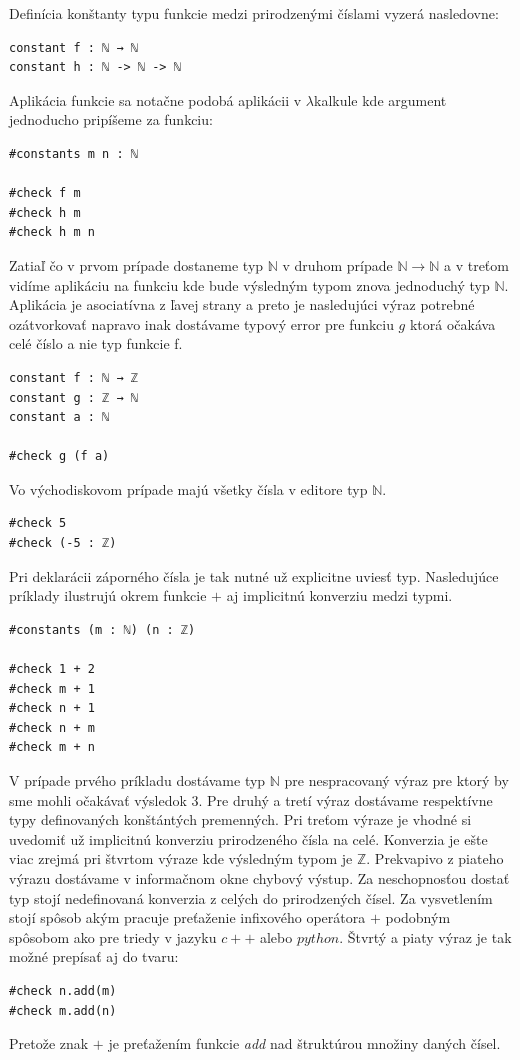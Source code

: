\documentclass[a4paper,10pt,oneside]{report}%
\begin{document}
    Definícia konštanty typu funkcie medzi prirodzenými číslami vyzerá nasledovne:
\begin{lstlisting}
constant f : ℕ → ℕ
constant h : ℕ -> ℕ -> ℕ
\end{lstlisting}
    Aplikácia funkcie sa notačne podobá aplikácii v $\lambda$kalkule kde argument
jednoducho pripíšeme za funkciu:
\begin{lstlisting}
#constants m n : ℕ

#check f m
#check h m
#check h m n
\end{lstlisting}
    Zatiaľ čo v prvom prípade dostaneme typ $\mathbb{N}$ v druhom prípade
$\mathbb{N} \to \mathbb{N}$ a v treťom vidíme aplikáciu na funkciu kde bude výsledným
typom znova jednoduchý typ $\mathbb{N}$.
    Aplikácia je asociatívna z ľavej strany a  preto je nasledujúci výraz potrebné 
ozátvorkovať napravo inak dostávame typový error pre funkciu $g$ ktorá očakáva 
celé číslo a nie typ funkcie f.
\begin{lstlisting}
constant f : ℕ → ℤ
constant g : ℤ → ℕ
constant a : ℕ

#check g (f a)
\end{lstlisting}
    Vo východiskovom prípade majú všetky čísla v editore typ $\mathbb{N}$.
\begin{lstlisting}
#check 5
#check (-5 : ℤ)
\end{lstlisting}
    Pri deklarácii záporného čísla je tak nutné už explicitne uviesť typ.
Nasledujúce príklady ilustrujú okrem funkcie $+$ aj implicitnú konverziu medzi typmi.
\begin{lstlisting}
#constants (m : ℕ) (n : ℤ)

#check 1 + 2
#check m + 1
#check n + 1
#check n + m
#check m + n
\end{lstlisting}
    V prípade prvého príkladu dostávame typ $\mathbb{N}$ pre nespracovaný výraz pre
ktorý by sme mohli očakávať výsledok $3$.
    Pre druhý a tretí výraz dostávame respektívne typy definovaných konštántých
premenných.
    Pri treťom výraze je vhodné si uvedomiť už implicitnú konverziu prirodzeného
čísla na celé.
    Konverzia je ešte viac zrejmá pri štvrtom výraze kde výsledným typom je
$\mathbb{Z}$.
    Prekvapivo z piateho výrazu dostávame v informačnom okne chybový výstup.
    Za neschopnosťou dostať typ stojí nedefinovaná konverzia z celých do prirodzených
čísel.
    Za vysvetlením stojí spôsob akým pracuje preťaženie infixového operátora $+$
podobným spôsobom ako pre triedy v jazyku $c++$ alebo $python$. Štvrtý a piaty
výraz je tak možné prepísať aj do tvaru:
\begin{lstlisting}
#check n.add(m)
#check m.add(n)
\end{lstlisting}
    Pretože znak $+$ je preťažením funkcie \emph{add} nad štruktúrou množiny daných
čísel.
\end{document}
